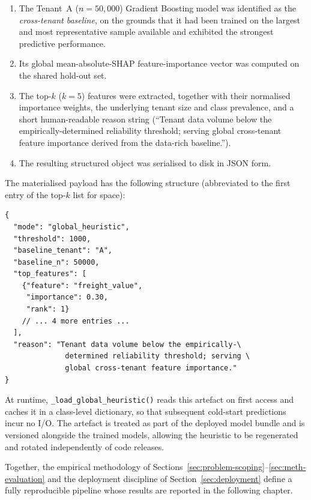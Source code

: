 \begin{enumerate}
    \item The Tenant~A ($n = 50{,}000$) Gradient Boosting model was
    identified as the \emph{cross-tenant baseline}, on the grounds that it
    had been trained on the largest and most representative sample
    available and exhibited the strongest predictive performance.
    \item Its global mean-absolute-SHAP feature-importance vector was
    computed on the shared hold-out set.
    \item The top-$k$ ($k = 5$) features were extracted, together with
    their normalised importance weights, the underlying tenant size and
    class prevalence, and a short human-readable reason string
    (``Tenant data volume below the empirically-determined reliability
    threshold; serving global cross-tenant feature importance derived from
    the data-rich baseline.'').
    \item The resulting structured object was serialised to disk in JSON
    form.
\end{enumerate}

The materialised payload has the following structure (abbreviated to the
first entry of the top-$k$ list for space):

\begin{verbatim}
{
  "mode": "global_heuristic",
  "threshold": 1000,
  "baseline_tenant": "A",
  "baseline_n": 50000,
  "top_features": [
    {"feature": "freight_value",
     "importance": 0.30,
     "rank": 1}
    // ... 4 more entries ...
  ],
  "reason": "Tenant data volume below the empirically-\
              determined reliability threshold; serving \
              global cross-tenant feature importance."
}
\end{verbatim}

At runtime, \texttt{\_load\_global\_heuristic()} reads this artefact on
first access and caches it in a class-level dictionary, so that subsequent
cold-start predictions incur no I/O. The artefact is treated as part of
the deployed model bundle and is versioned alongside the trained models,
allowing the heuristic to be regenerated and rotated independently of
code releases.

Together, the empirical methodology of
Sections~\ref{sec:problem-scoping}--\ref{sec:meth-evaluation} and the
deployment discipline of Section~\ref{sec:deployment} define a fully
reproducible pipeline whose results are reported in the following chapter.
